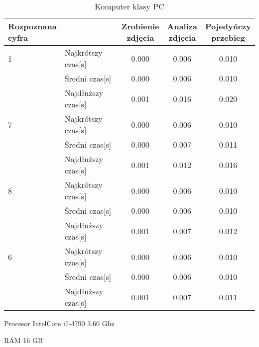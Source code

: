\begin{table}[H]
    \centering
    \begin{threeparttable}
        \caption{Komputer klasy PC}
        \begin{tabular}{|l|l|ccc|}
            \toprule
            \thead{Rozpoznana \\ cyfra} & & \thead{Zrobienie \\ zdjęcia} &
            \thead{Analiza \\ zdjęcia} & \thead{Pojedyńczy \\ przebieg} \\
            \midrule
            1 & Najkrótszy czas[s] & 0.000 & 0.006 & 0.010 \\
            & Średni czas[s] & 0.000 & 0.006 & 0.010 \\
            & Najdłuższy czas[s] & 0.001 & 0.016 & 0.020 \\
            \midrule
            7 & Najkrótszy czas[s] & 0.000 & 0.006 & 0.010 \\
            & Średni czas[s] & 0.000 & 0.007 & 0.011 \\
            & Najdłuższy czas[s] & 0.001 & 0.012 & 0.016 \\
            \midrule
            8 & Najkrótszy czas[s] & 0.000 & 0.006 & 0.010 \\
            & Średni czas[s] & 0.000 & 0.006 & 0.010 \\
            & Najdłuższy czas[s] & 0.001 & 0.007 & 0.012 \\
            \midrule
            6 & Najkrótszy czas[s] & 0.000 & 0.006 & 0.010 \\
            & Średni czas[s] & 0.000 & 0.006 & 0.010 \\
            & Najdłuższy czas[s] & 0.001 & 0.007 & 0.011 \\
            \bottomrule
        \end{tabular}
        \begin{tablenotes}
            \item Procesor IntelCore i7-4790 3.60 Ghz
            \item RAM 16 GB
        \end{tablenotes}
    \end{threeparttable}
\end{table}

